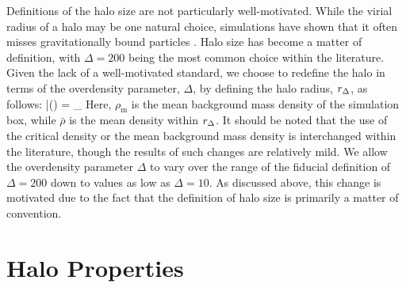 \documentclass[usenatbib,usegraphicx,letterpaper]{mn2e}
\begin{document}
Definitions of the halo size are not particularly well-motivated. While the virial radius of a halo may be one natural choice, simulations have shown that it often misses gravitationally bound particles \citep*{kazan06}. Halo size has become a matter of definition, with $\Delta=200$ being the most common choice within the literature. Given the lack of a well-motivated standard, we choose to redefine the halo in terms of the overdensity parameter, $\Delta$, by defining the halo radius, $r_{\Delta}$, as follows:
\beq
	\bar{\rho}(\Rdel) = \Delta \rho_{}
\eeq
Here, $\rho_{\mathrm{m}}$ is the mean background mass density of the simulation box, while $\bar{\rho}$ is the mean density within $r_{\Delta}$. It should be noted that the use of the critical density or the mean background mass density is interchanged within the literature, though the results of such changes are relatively mild. We allow the overdensity parameter $\Delta$ to vary over the range of the fiducial definition of $\Delta = 200$ down to values as low as $\Delta = 10$. As discussed above, this change is motivated due to the fact that the definition of halo size is primarily a matter of convention.

\section{Halo Properties}
\label{section:haloprops}



\end{document}
